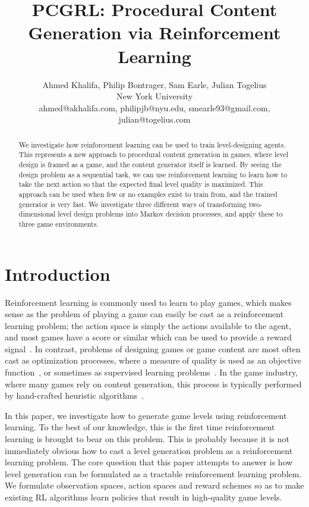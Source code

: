 \documentclass[letterpaper]{article} %
\title{PCGRL: Procedural Content Generation via Reinforcement Learning}
\author{Ahmed Khalifa, Philip Bontrager, Sam Earle, Julian Togelius\\ 
New York University\\
ahmed@akhalifa.com, philipjb@nyu.edu, smearle93@gmail.com, julian@togelius.com
}
\begin{document}
\maketitle

\begin{abstract}
We investigate how reinforcement learning can be used to train level-designing agents. This represents a new approach to procedural content generation in games, where level design is framed as a game, and the content generator itself is learned. By seeing the design problem as a sequential task, we can use reinforcement learning to learn how to take the next action so that the expected final level quality is maximized. This approach can be used when few or no examples exist to train from, and the trained generator is very fast. We investigate three different ways of transforming two-dimensional level design problems into Markov decision processes, and apply these to three game environments.
\end{abstract}

\section{Introduction}
Reinforcement learning is commonly used to learn to play games, which makes sense as the problem of playing a game can easily be cast as a reinforcement learning problem; the action space is simply the actions available to the agent, and most games have a score or similar which can be used to provide a reward signal~\cite{justesen2019deep}. In contrast, problems of designing games or game content are most often cast as optimization processes, where a measure of quality is used as an objective function~\cite{togelius2011search}, or sometimes as supervised learning problems~\cite{summerville2018procedural}. In the game industry, where many games rely on content generation, this process is typically performed by hand-crafted heuristic algorithms~\cite{shaker2016procedural}.

In this paper, we investigate how to generate game levels using reinforcement learning. To the best of our knowledge, this is the first time reinforcement learning is brought to bear on this problem. This is probably because it is not immediately obvious how to cast a level generation problem as a reinforcement learning problem. The core question that this paper attempts to answer is how level generation can be formulated as a tractable reinforcement learning problem. We formulate observation spaces, action spaces and reward schemes so as to make existing RL algorithms learn policies that result in high-quality game levels.
\end{document}
